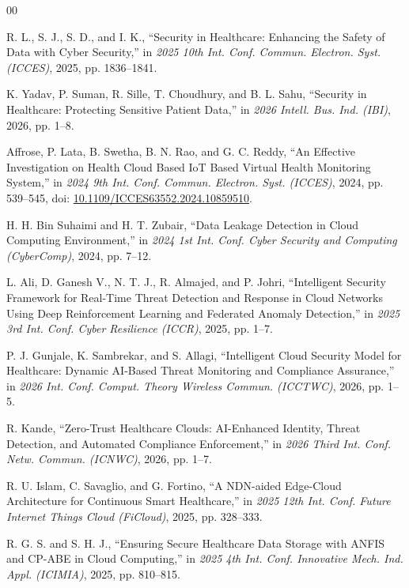 \documentclass{ieeeaccess}
\begin{document}
\begin{thebibliography}{00}

 R. L., S. J., S. D., and I. K., ``Security in Healthcare: Enhancing the Safety of Data with Cyber Security,'' in \emph{2025 10th Int. Conf. Commun. Electron. Syst. (ICCES)}, 2025, pp. 1836--1841.

 K. Yadav, P. Suman, R. Sille, T. Choudhury, and B. L. Sahu, ``Security in Healthcare: Protecting Sensitive Patient Data,'' in \emph{2026 Intell. Bus. Ind. (IBI)}, 2026, pp. 1--8.

 Affrose, P. Lata, B. Swetha, B. N. Rao, and G. C. Reddy, ``An Effective Investigation on Health Cloud Based IoT Based Virtual Health Monitoring System,'' in \emph{2024 9th Int. Conf. Commun. Electron. Syst. (ICCES)}, 2024, pp. 539--545, doi: \href{https://doi.org/10.1109/ICCES63552.2024.10859510}{10.1109/ICCES63552.2024.10859510}.

 H. H. Bin Suhaimi and H. T. Zubair, ``Data Leakage Detection in Cloud Computing Environment,'' in \emph{2024 1st Int. Conf. Cyber Security and Computing (CyberComp)}, 2024, pp. 7--12.

 L. Ali, D. Ganesh V., N. T. J., R. Almajed, and P. Johri, ``Intelligent Security Framework for Real-Time Threat Detection and Response in Cloud Networks Using Deep Reinforcement Learning and Federated Anomaly Detection,'' in \emph{2025 3rd Int. Conf. Cyber Resilience (ICCR)}, 2025, pp. 1--7.

 P. J. Gunjale, K. Sambrekar, and S. Allagi, ``Intelligent Cloud Security Model for Healthcare: Dynamic AI-Based Threat Monitoring and Compliance Assurance,'' in \emph{2026 Int. Conf. Comput. Theory Wireless Commun. (ICCTWC)}, 2026, pp. 1--5.

 R. Kande, ``Zero-Trust Healthcare Clouds: AI-Enhanced Identity, Threat Detection, and Automated Compliance Enforcement,'' in \emph{2026 Third Int. Conf. Netw. Commun. (ICNWC)}, 2026, pp. 1--7.

 R. U. Islam, C. Savaglio, and G. Fortino, ``A NDN-aided Edge-Cloud Architecture for Continuous Smart Healthcare,'' in \emph{2025 12th Int. Conf. Future Internet Things Cloud (FiCloud)}, 2025, pp. 328--333.

 R. G. S. and S. H. J., ``Ensuring Secure Healthcare Data Storage with ANFIS and CP-ABE in Cloud Computing,'' in \emph{2025 4th Int. Conf. Innovative Mech. Ind. Appl. (ICIMIA)}, 2025, pp. 810--815.


\end{thebibliography}
\end{document}
